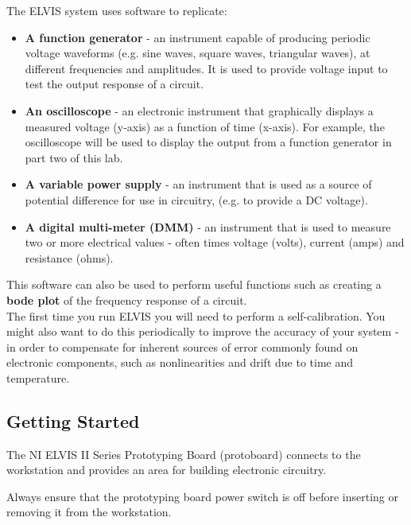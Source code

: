 \documentclass{article}
\begin{document}
The ELVIS system uses software to replicate:
\begin{itemize}
	\item \textbf{A function generator} - an instrument capable of producing periodic voltage waveforms (e.g. sine waves, square waves, triangular waves), at different frequencies and amplitudes. It is used to provide voltage input to test the output response of a circuit.
	\item \textbf{An oscilloscope} - an electronic instrument that graphically displays a measured voltage (y-axis) as a function of time (x-axis). For example, the oscilloscope will be used to display the output from a function generator in part two of this lab.
	\item \textbf{A variable power supply} - an instrument that is used as a source of potential difference for use in circuitry, (e.g. to provide a DC voltage).
	\item \textbf{A digital multi-meter (DMM)} - an instrument that is used to measure two or more electrical values - often times voltage (volts), current (amps) and resistance (ohms).
\end{itemize}

This software can also be used to perform useful functions such as creating a \textbf{bode plot} of the frequency response of a circuit.\\

The first time you run ELVIS you will need to perform a self-calibration. You might also want to do this periodically to improve the accuracy of your system - in order to compensate for inherent sources of error commonly found on electronic components, such as nonlinearities and drift due to time and temperature. 

\subsection*{Getting Started}
The NI ELVIS II Series Prototyping Board (protoboard) connects to the workstation and provides an area for building electronic circuitry.

\begin{warn}
	Always ensure that the prototyping board power switch is off before inserting or removing it from the workstation.
\end{warn}
\end{document}
